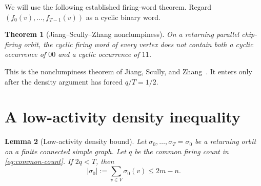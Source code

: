 \documentclass[11pt]{article}
\newtheorem{theorem}{Theorem}[section]
\newtheorem{lemma}[theorem]{Lemma}
\theoremstyle{definition}
\theoremstyle{remark}
\newcommand{\chips}[1]{\lvert #1\rvert}
\begin{document}
We will use the following established firing-word theorem. Regard
$(f_0(v),\ldots,f_{T-1}(v))$ as a cyclic binary word.

\begin{theorem}[Jiang--Scully--Zhang nonclumpiness]\label{thm:nonclumpy}
On a returning parallel chip-firing orbit, the cyclic firing word of every
vertex does not contain both a cyclic occurrence of $00$ and a cyclic
occurrence of $11$.
\end{theorem}

This is the nonclumpiness theorem of
Jiang, Scully, and Zhang~\cite[Theorem~6.2]{JiangScullyZhang2015}. It enters
only after the density argument has forced $q/T=1/2$.

\section{A low-activity density inequality}

\begin{lemma}[Low-activity density bound]\label{lem:low-density}
Let $\sigma_0,\ldots,\sigma_T=\sigma_0$ be a returning orbit on a finite
connected simple graph. Let $q$ be the common firing count in
\eqref{eq:common-count}. If $2q<T$, then
\[
   \chips{\sigma_0}:=\sum_{v\in V}\sigma_0(v)\le 2m-n.
\]
\end{lemma}
\end{document}
